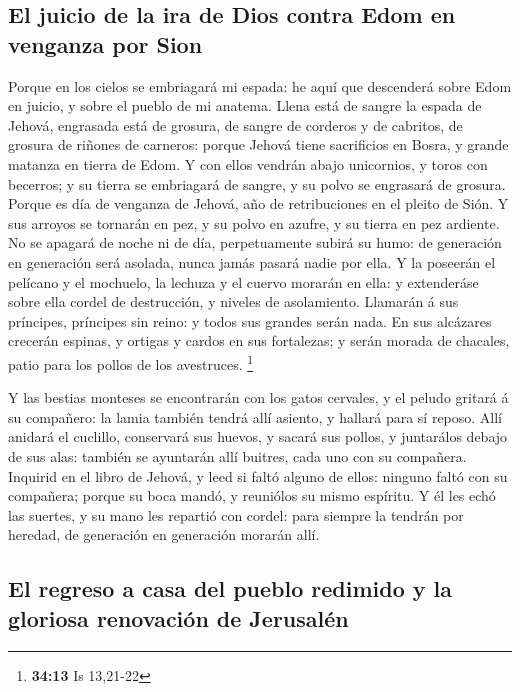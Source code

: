 \hypertarget{el-juicio-de-la-ira-de-dios-contra-edom-en-venganza-por-sion}{%
\subsection{El juicio de la ira de Dios contra Edom en venganza por
Sion}\label{el-juicio-de-la-ira-de-dios-contra-edom-en-venganza-por-sion}}

 Porque en los cielos se embriagará mi espada: he aquí que
descenderá sobre Edom en juicio, y sobre el pueblo de mi anatema.
 Llena está de sangre la espada de Jehová, engrasada está de
grosura, de sangre de corderos y de cabritos, de grosura de riñones de
carneros: porque Jehová tiene sacrificios en Bosra, y grande matanza en
tierra de Edom.  Y con ellos vendrán abajo unicornios, y
toros con becerros; y su tierra se embriagará de sangre, y su polvo se
engrasará de grosura.  Porque es día de venganza de Jehová,
año de retribuciones en el pleito de Sión.  Y sus arroyos se
tornarán en pez, y su polvo en azufre, y su tierra en pez ardiente.
 No se apagará de noche ni de día, perpetuamente subirá su
humo: de generación en generación será asolada, nunca jamás pasará nadie
por ella.  Y la poseerán el pelícano y el mochuelo, la
lechuza y el cuervo morarán en ella: y extenderáse sobre ella cordel de
destrucción, y niveles de asolamiento.  Llamarán á sus
príncipes, príncipes sin reino: y todos sus grandes serán nada.
 En sus alcázares crecerán espinas, y ortigas y cardos en
sus fortalezas; y serán morada de chacales, patio para los pollos de los
avestruces. \footnote{\textbf{34:13} Is 13,21-22}

 Y las bestias monteses se encontrarán con los gatos
cervales, y el peludo gritará á su compañero: la lamia también tendrá
allí asiento, y hallará para sí reposo.  Allí anidará el
cuclillo, conservará sus huevos, y sacará sus pollos, y juntarálos
debajo de sus alas: también se ayuntarán allí buitres, cada uno con su
compañera.  Inquirid en el libro de Jehová, y leed si faltó
alguno de ellos: ninguno faltó con su compañera; porque su boca mandó, y
reuniólos su mismo espíritu.  Y él les echó las suertes, y
su mano les repartió con cordel: para siempre la tendrán por heredad, de
generación en generación morarán allí.

\hypertarget{el-regreso-a-casa-del-pueblo-redimido-y-la-gloriosa-renovaciuxf3n-de-jerusaluxe9n}{%
\subsection{El regreso a casa del pueblo redimido y la gloriosa
renovación de
Jerusalén}\label{el-regreso-a-casa-del-pueblo-redimido-y-la-gloriosa-renovaciuxf3n-de-jerusaluxe9n}}

